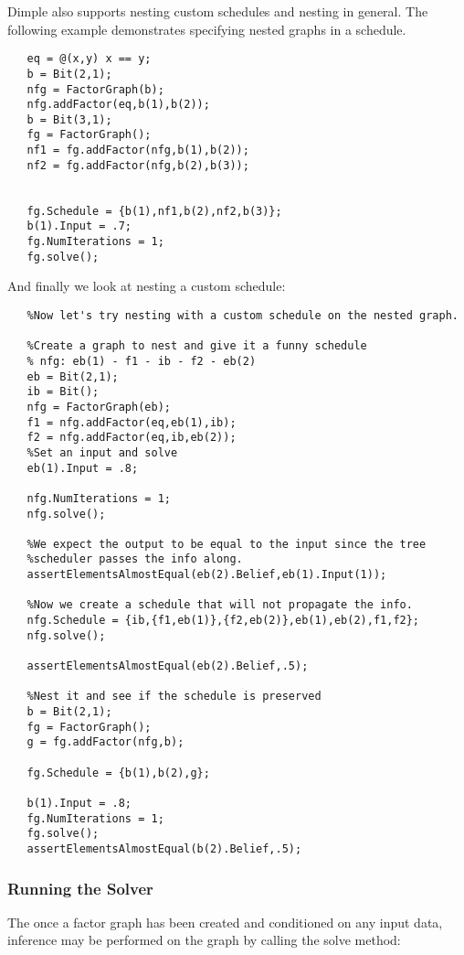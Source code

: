 Dimple also supports nesting custom schedules and nesting in general. The following example demonstrates specifying nested graphs in a schedule.

\begin{lstlisting}
   eq = @(x,y) x == y;
   b = Bit(2,1);
   nfg = FactorGraph(b);
   nfg.addFactor(eq,b(1),b(2));
   b = Bit(3,1);
   fg = FactorGraph();
   nf1 = fg.addFactor(nfg,b(1),b(2));
   nf2 = fg.addFactor(nfg,b(2),b(3));
   
   
   fg.Schedule = {b(1),nf1,b(2),nf2,b(3)};
   b(1).Input = .7;
   fg.NumIterations = 1;
   fg.solve();
\end{lstlisting}

And finally we look at nesting a custom schedule:


\begin{lstlisting}
   %Now let's try nesting with a custom schedule on the nested graph.
   
   %Create a graph to nest and give it a funny schedule    
   % nfg: eb(1) - f1 - ib - f2 - eb(2)
   eb = Bit(2,1);
   ib = Bit();
   nfg = FactorGraph(eb);
   f1 = nfg.addFactor(eq,eb(1),ib);
   f2 = nfg.addFactor(eq,ib,eb(2));
   %Set an input and solve
   eb(1).Input = .8;
   
   nfg.NumIterations = 1;
   nfg.solve();
   
   %We expect the output to be equal to the input since the tree
   %scheduler passes the info along.
   assertElementsAlmostEqual(eb(2).Belief,eb(1).Input(1));
   
   %Now we create a schedule that will not propagate the info.
   nfg.Schedule = {ib,{f1,eb(1)},{f2,eb(2)},eb(1),eb(2),f1,f2};
   nfg.solve();
   
   assertElementsAlmostEqual(eb(2).Belief,.5);

   %Nest it and see if the schedule is preserved
   b = Bit(2,1);
   fg = FactorGraph();
   g = fg.addFactor(nfg,b);
   
   fg.Schedule = {b(1),b(2),g};
   
   b(1).Input = .8;
   fg.NumIterations = 1;
   fg.solve();
   assertElementsAlmostEqual(b(2).Belief,.5);
\end{lstlisting}


\subsubsection{Running the Solver}

The once a factor graph has been created and conditioned on any input data, inference may be performed on the graph by calling the solve method:

